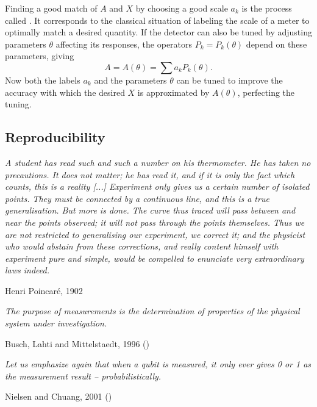\documentclass[12pt]{article}
\begin{document}
Finding a good match of $A$ and $X$ by choosing a good scale $a_k$ is
the process called . It corresponds to the classical
situation of labeling the scale of a meter to optimally match a desired
quantity. If the detector can also be tuned by adjusting parameters
$\theta$ affecting its responses, the operators $P_k=P_k(\theta)$
depend on these parameters, giving
\[
A=A(\theta)=\sum a_kP_k(\theta).
\]
Now both the labels $a_k$ and the parameters $\theta$ can be tuned to
improve the accuracy with which the desired $X$ is approximated by
$A(\theta)$, perfecting the tuning.




\subsection{Reproducibility}\label{ss.rep}

\nopagebreak
\hfill\parbox[t]{10.8cm}{\footnotesize

{\em A student has read such and such a number on his thermometer.
He has taken no precautions. It does not matter; he has read it, and if
it is only the fact which counts, this is a reality [...]
Experiment only gives us a certain number of isolated points. They must
be connected by a continuous line, and this is a true generalisation.
But more is done. The curve thus traced will pass between and near the
points observed; it will not pass through the points themselves.
Thus we are not restricted to generalising our experiment, we correct
it; and the physicist who would abstain from these corrections, and
really content himself with experiment pure and simple, would be
compelled to enunciate very extraordinary laws indeed.}

\hfill Henri Poincar\'e, 1902 \cite[p.142f]{PoiScH}
}

\bigskip


\nopagebreak
\hfill\parbox[t]{10.8cm}{\footnotesize

{\em The purpose of measurements is the determination of properties of
the physical system under investigation.
}

\hfill Busch, Lahti and Mittelstaedt, 1996 (\cite[p.25]{BusLM})
}

\bigskip


\nopagebreak
\hfill\parbox[t]{10.8cm}{\footnotesize

{\em
Let us emphasize again that when a qubit is measured, it only ever
gives 0 or 1 as the measurement result -- probabilistically.}

\hfill Nielsen and Chuang, 2001 (\cite[p.14]{NieC})
}
\end{document}
